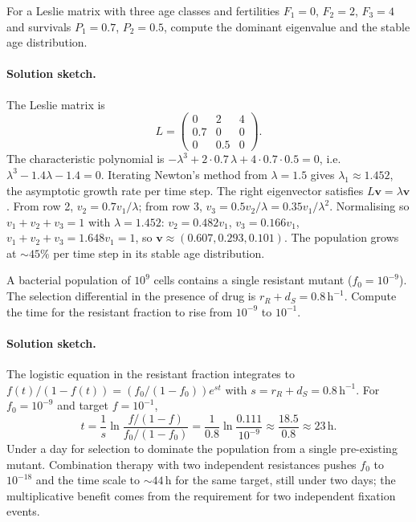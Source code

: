 \begin{exercise}
For a Leslie matrix with three age classes and fertilities
$F_1 = 0$, $F_2 = 2$, $F_3 = 4$ and survivals $P_1 = 0.7$, $P_2 =
0.5$, compute the dominant eigenvalue and the stable age
distribution.

\paragraph{Solution sketch.} The Leslie matrix is
\[
L = \begin{pmatrix} 0 & 2 & 4 \\ 0.7 & 0 & 0 \\ 0 & 0.5 & 0
\end{pmatrix}.
\]
The characteristic polynomial is
$-\lambda^3 + 2 \cdot 0.7\,\lambda + 4 \cdot 0.7 \cdot 0.5 = 0$,
i.e.\ $\lambda^3 - 1.4\lambda - 1.4 = 0$. Iterating Newton's method
from $\lambda = 1.5$ gives $\lambda_1 \approx 1.452$, the
asymptotic growth rate per time step. The right eigenvector
satisfies $L\mathbf{v} = \lambda \mathbf{v}$. From row 2,
$v_2 = 0.7 v_1 / \lambda$; from row 3, $v_3 = 0.5 v_2 / \lambda =
0.35 v_1 / \lambda^2$. Normalising so $v_1 + v_2 + v_3 = 1$ with
$\lambda = 1.452$: $v_2 = 0.482 v_1$, $v_3 = 0.166 v_1$,
$v_1 + v_2 + v_3 = 1.648 v_1 = 1$, so $\mathbf{v} \approx (0.607,
0.293, 0.101)$. The population grows at $\sim 45\%$ per time step
in its stable age distribution.
\end{exercise}

\begin{exercise}
A bacterial population of $10^9$ cells contains a single resistant
mutant ($f_0 = 10^{-9}$). The selection differential in the presence
of drug is $r_R + d_S = 0.8\,\text{h}^{-1}$. Compute the time for the
resistant fraction to rise from $10^{-9}$ to $10^{-1}$.

\paragraph{Solution sketch.} The logistic equation in the resistant
fraction integrates to $f(t)/(1 - f(t)) = (f_0/(1 - f_0)) e^{st}$
with $s = r_R + d_S = 0.8\,\text{h}^{-1}$. For $f_0 = 10^{-9}$ and
target $f = 10^{-1}$,
\[
t = \frac{1}{s} \ln \frac{f/(1-f)}{f_0/(1-f_0)} =
\frac{1}{0.8} \ln \frac{0.111}{10^{-9}} \approx \frac{18.5}{0.8}
\approx 23\,\text{h}.
\]
Under a day for selection to dominate the population from a single
pre-existing mutant. Combination therapy with two independent
resistances pushes $f_0$ to $10^{-18}$ and the time scale to $\sim
44\,\text{h}$ for the same target, still under two days; the
multiplicative benefit comes from the requirement for two
independent fixation events.
\end{exercise}

